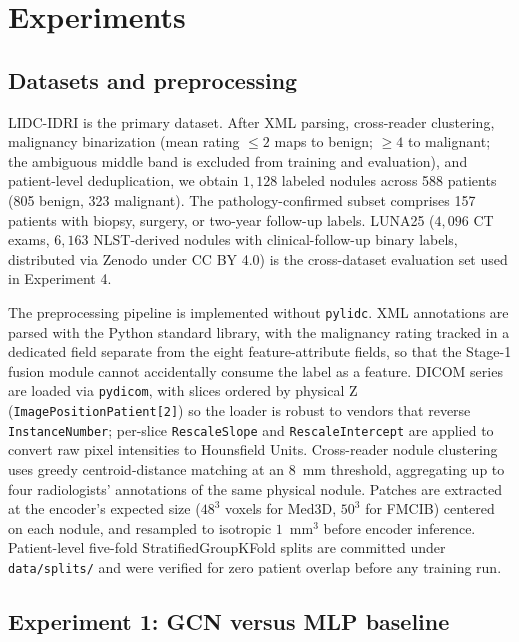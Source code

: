 \documentclass[10pt,letterpaper,twocolumn]{article}
\begin{document}
\section{Experiments}
\label{sec:experiments}

\subsection{Datasets and preprocessing}

LIDC-IDRI is the primary dataset. After XML parsing, cross-reader clustering, malignancy binarization (mean rating $\le 2$ maps to benign; $\ge 4$ to malignant; the ambiguous middle band is excluded from training and evaluation), and patient-level deduplication, we obtain $1{,}128$ labeled nodules across 588 patients (805 benign, 323 malignant). The pathology-confirmed subset comprises 157 patients with biopsy, surgery, or two-year follow-up labels. LUNA25 ($4{,}096$ CT exams, $6{,}163$ NLST-derived nodules with clinical-follow-up binary labels, distributed via Zenodo under CC BY 4.0) is the cross-dataset evaluation set used in Experiment 4.

The preprocessing pipeline is implemented without \texttt{pylidc}. XML annotations are parsed with the Python standard library, with the malignancy rating tracked in a dedicated field separate from the eight feature-attribute fields, so that the Stage-1 fusion module cannot accidentally consume the label as a feature. DICOM series are loaded via \texttt{pydicom}, with slices ordered by physical Z (\texttt{ImagePositionPatient[2]}) so the loader is robust to vendors that reverse \texttt{InstanceNumber}; per-slice \texttt{RescaleSlope} and \texttt{RescaleIntercept} are applied to convert raw pixel intensities to Hounsfield Units. Cross-reader nodule clustering uses greedy centroid-distance matching at an 8~mm threshold, aggregating up to four radiologists' annotations of the same physical nodule. Patches are extracted at the encoder's expected size ($48^3$ voxels for Med3D, $50^3$ for FMCIB) centered on each nodule, and resampled to isotropic $1$~mm$^3$ before encoder inference. Patient-level five-fold StratifiedGroupKFold splits are committed under \texttt{data/splits/} and were verified for zero patient overlap before any training run.

\subsection{Experiment 1: GCN versus MLP baseline}
\end{document}
